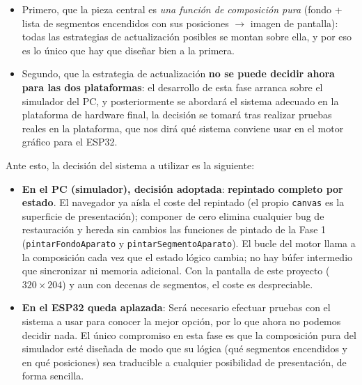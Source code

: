 \begin{itemize}
	\item Primero, que la pieza central es \emph{una función de composición pura} (fondo + lista de segmentos encendidos con sus posiciones $\rightarrow$ imagen de pantalla): todas las estrategias de actualización posibles se montan sobre ella, y por eso es lo único que hay que diseñar bien a la primera.
	
	\item Segundo, que la estrategia de actualización \textbf{no se puede decidir ahora para las dos plataformas}: el desarrollo de esta fase arranca sobre el simulador del PC, y posteriormente se abordará el sistema adecuado en la plataforma de hardware final, la decisión se tomará tras realizar pruebas reales en la plataforma, que nos dirá qué sistema conviene usar en el motor gráfico para el ESP32.
\end{itemize}
	
Ante esto, la decisión del sistema a utilizar es la siguiente:

\begin{itemize}
	\item \textbf{En el PC (simulador), decisión adoptada}: \textbf{repintado completo por estado}. El navegador ya aísla el coste del repintado (el propio \texttt{canvas} es la superficie de presentación); componer de cero elimina cualquier bug de restauración y hereda sin cambios las funciones de pintado de la Fase 1 (\texttt{pintarFondoAparato} y \texttt{pintarSegmentoAparato}). El bucle del motor llama a la composición cada vez que el estado lógico cambia; no hay búfer intermedio que sincronizar ni memoria adicional. Con la pantalla de este proyecto ($320 \times 204$) y aun con decenas de segmentos, el coste es despreciable.
	
	\item \textbf{En el ESP32 queda aplazada}: Será necesario efectuar pruebas con el sistema a usar para conocer la mejor opción, por lo que ahora no podemos decidir nada. El único compromiso en esta fase es que la composición pura del simulador esté diseñada de modo que su lógica (qué segmentos encendidos y en qué posiciones) sea traducible a cualquier posibilidad de presentación, de forma sencilla.
\end{itemize} 

\clearpage